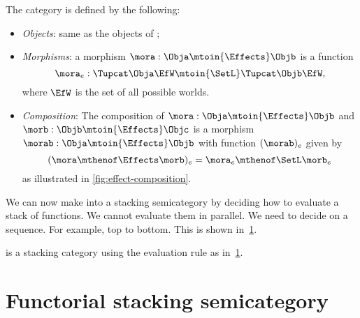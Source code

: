 \begin{definition}
	The \Effects category is defined by the following:
	\begin{itemize}
		\item \emph{Objects}: same as the objects of \SetL;
		\item \emph{Morphisms}: a morphism $\mora: \Obja \mtoin{\Effects} \Objb$ is a function
		      \begin{equation}
			      \mora_e: \Tupcat \Obja \EfW \mtoin{\SetL} \Tupcat \Objb \EfW,
		      \end{equation}
		      where $\EfW$ is the set of all possible worlds.
		\item \emph{Composition}: The composition of  $\mora: \Obja \mtoin{\Effects} \Objb$ and
		      $\morb: \Objb \mtoin{\Effects} \Objc$ is a morphism $\morab: \Obja \mtoin{\Effects} \Objb$ with function $(\morab)_e$ given by
		      \begin{equation}
			      (\mora \mthenof \Effects \morb)
			      _e = \mora_e \mthenof\SetL \morb_e
		      \end{equation}
		      as illustrated in \cref{fig:effect-composition}.
	\end{itemize}
\end{definition}

We can now make \Effects into a stacking semicategory by deciding how to evaluate a stack of functions.
We cannot evaluate them in parallel.
We need to decide on a sequence.
For example, top to bottom.
This is shown in~\cref{fig:effect-stacking}.

\begin{lemma}
	\label{lem:effects-is-stacking}
	\Effects is a stacking category using the evaluation rule as in~\cref{fig:effect-stacking}.
\end{lemma}

\begin{figure}[h!]
	\centering
	\caption{}
	\label{fig:effect-stacking}
\end{figure}


\section{Functorial stacking semicategory}

